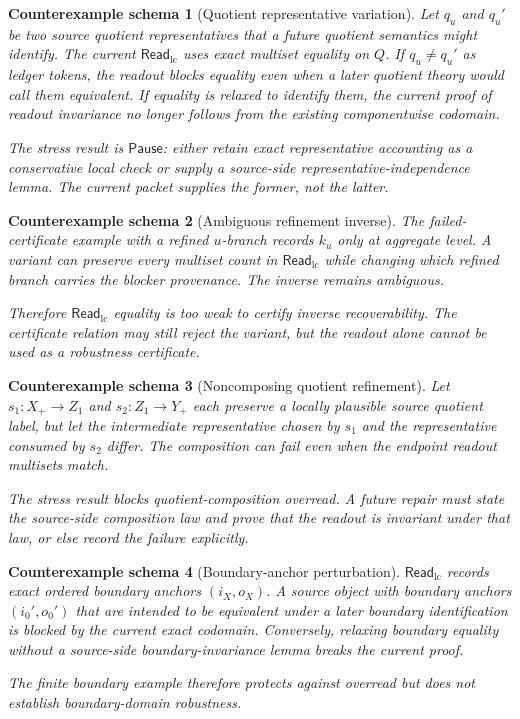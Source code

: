 \documentclass[11pt]{article}
\newcommand{\ReadLC}{\mathsf{Read}_{\mathrm{lc}}}
\newcommand{\Pause}{\mathsf{Pause}}
\newtheorem{counterexample}{Counterexample schema}
\begin{document}
\begin{counterexample}[Quotient representative variation]
Let \(q_u\) and \(q_u'\) be two source quotient representatives that a
future quotient semantics might identify. The current \(\ReadLC\)
uses exact multiset equality on \(Q\). If \(q_u\neq q_u'\) as ledger
tokens, the readout blocks equality even when a later quotient theory
would call them equivalent. If equality is relaxed to identify them,
the current proof of readout invariance no longer follows from the
existing componentwise codomain.

The stress result is \(\Pause\): either retain exact representative
accounting as a conservative local check or supply a source-side
representative-independence lemma. The current packet supplies the
former, not the latter.
\end{counterexample}

\begin{counterexample}[Ambiguous refinement inverse]
The failed-certificate example with a refined \(u\)-branch records
\(k_u\) only at aggregate level. A variant can preserve every multiset
count in \(\ReadLC\) while changing which refined branch carries the
blocker provenance. The inverse remains ambiguous.

Therefore \(\ReadLC\) equality is too weak to certify inverse
recoverability. The certificate relation may still reject the variant,
but the readout alone cannot be used as a robustness certificate.
\end{counterexample}

\begin{counterexample}[Noncomposing quotient refinement]
Let \(s_1:X_{+}\to Z_1\) and \(s_2:Z_1\to Y_{+}\) each preserve a
locally plausible source quotient label, but let the intermediate
representative chosen by \(s_1\) and the representative consumed by
\(s_2\) differ. The composition can fail even when the endpoint readout
multisets match.

The stress result blocks quotient-composition overread. A future repair
must state the source-side composition law and prove that the readout
is invariant under that law, or else record the failure explicitly.
\end{counterexample}

\begin{counterexample}[Boundary-anchor perturbation]
\(\ReadLC\) records exact ordered boundary anchors \((i_X,o_X)\). A
source object with boundary anchors \((i_0',o_0')\) that are intended
to be equivalent under a later boundary identification is blocked by
the current exact codomain. Conversely, relaxing boundary equality
without a source-side boundary-invariance lemma breaks the current
proof.

The finite boundary example therefore protects against overread but
does not establish boundary-domain robustness.
\end{counterexample}
\end{document}

